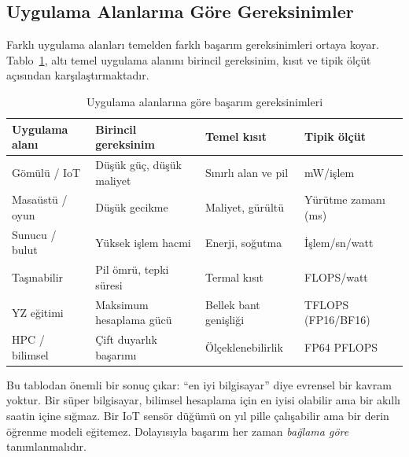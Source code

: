 \subsection{Uygulama Alanlarına Göre Gereksinimler}
\label{subsec:uygulama-gereksinimleri}

Farklı uygulama alanları temelden farklı başarım gereksinimleri ortaya koyar. Tablo~\ref{tab:gereksinim-matrisi}, altı temel uygulama alanını birincil gereksinim, kısıt ve tipik ölçüt açısından karşılaştırmaktadır.

\begin{table}[H]
\centering
\caption{Uygulama alanlarına göre başarım gereksinimleri}
\label{tab:gereksinim-matrisi}
\small
\begin{tabular}{lp{2.8cm}p{2.8cm}p{2.8cm}}
\toprule
\textbf{Uygulama alanı} & \textbf{Birincil gereksinim} & \textbf{Temel kısıt} & \textbf{Tipik ölçüt} \\
\midrule
Gömülü / IoT          & Düşük güç, düşük maliyet & Sınırlı alan ve pil & mW/işlem \\
Masaüstü / oyun       & Düşük gecikme            & Maliyet, gürültü     & Yürütme zamanı (ms) \\
Sunucu / bulut        & Yüksek işlem hacmi             & Enerji, soğutma      & İşlem/sn/watt \\
Taşınabilir           & Pil ömrü, tepki süresi   & Termal kısıt         & FLOPS/watt \\
YZ eğitimi            & Maksimum hesaplama gücü  & Bellek bant genişliği & TFLOPS (FP16/BF16) \\
HPC / bilimsel        & Çift duyarlık başarımı   & Ölçeklenebilirlik    & FP64 PFLOPS \\
\bottomrule
\end{tabular}
\end{table}

Bu tablodan önemli bir sonuç çıkar: ``en iyi bilgisayar'' diye evrensel bir kavram yoktur. Bir süper bilgisayar, bilimsel hesaplama için en iyisi olabilir ama bir akıllı saatin içine sığmaz. Bir IoT sensör düğümü on yıl pille çalışabilir ama bir derin öğrenme modeli eğitemez. Dolayısıyla başarım her zaman \emph{bağlama göre} tanımlanmalıdır.


